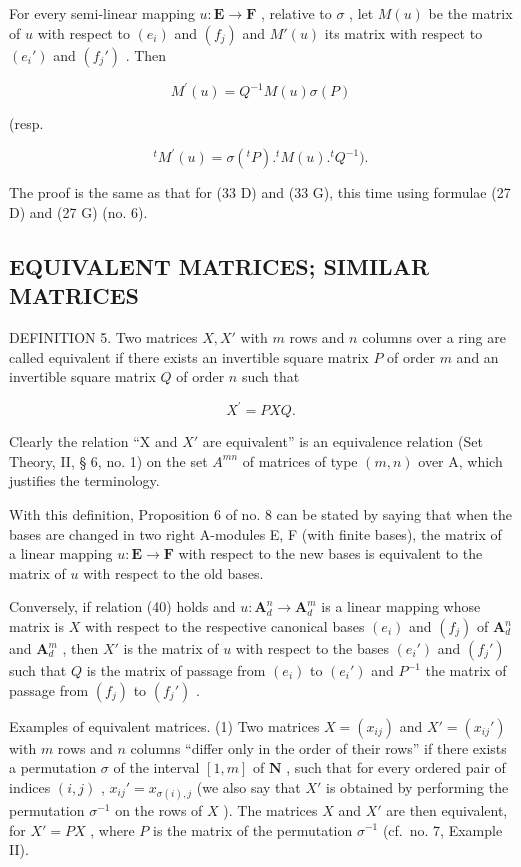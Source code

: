 For every semi-linear mapping \(u: \mathbf{E} \to \mathbf{F}\) , relative to \(\sigma\) , let \(M(u)\) be the matrix of \(u\) with respect to \((e_i)\) and \((f_j)\) and \(M'(u)\) its matrix with respect to \((e_i')\) and \((f_j')\) . Then

\[
M ^ {\prime} (u) = Q ^ {- 1} M (u) \sigma (P)\tag{39 D}
\]

(resp.

\[
{ } ^ { t } M ^ { \prime } ( u ) = \sigma ( { } ^ { t } P ) . { } ^ { t } M ( u ) . { } ^ { t } Q ^ { - 1 } ) .\tag{39 G}
\]

The proof is the same as that for (33 D) and (33 G), this time using formulae (27 D) and (27 G) (no. 6).

\subsection{EQUIVALENT MATRICES; SIMILAR MATRICES}

DEFINITION 5. Two matrices \(X, X'\) with \(m\) rows and \(n\) columns over a ring are called equivalent if there exists an invertible square matrix \(P\) of order \(m\) and an invertible square matrix \(Q\) of order \(n\) such that

\[
X ^ {\prime} = P X Q.\tag{40}
\]

Clearly the relation ``X and \(X'\) are equivalent'' is an equivalence relation (Set Theory, II, § 6, no. 1) on the set \(A^{mn}\) of matrices of type \((m, n)\) over A, which justifies the terminology.

With this definition, Proposition 6 of no. 8 can be stated by saying that when the bases are changed in two right A-modules E, F (with finite bases), the matrix of a linear mapping \(u \colon \mathbf{E} \to \mathbf{F}\) with respect to the new bases is equivalent to the matrix of \(u\) with respect to the old bases.

Conversely, if relation (40) holds and \(u \colon \mathbf{A}_d^n \to \mathbf{A}_d^m\) is a linear mapping whose matrix is \(X\) with respect to the respective canonical bases \((e_i)\) and \((f_j)\) of \(\mathbf{A}_d^n\) and \(\mathbf{A}_d^m\) , then \(X'\) is the matrix of \(u\) with respect to the bases \((e_i')\) and \((f_j')\) such that \(Q\) is the matrix of passage from \((e_i)\) to \((e_i')\) and \(P^{-1}\) the matrix of passage from \((f_j)\) to \((f_j')\) .

Examples of equivalent matrices. (1) Two matrices \(X = (x_{ij})\) and \(X' = (x_{ij}')\) with \(m\) rows and \(n\) columns ``differ only in the order of their rows'' if there exists a permutation \(\sigma\) of the interval \([1, m]\) of \(\mathbf{N}\) , such that for every ordered pair of indices \((i,j)\) , \(x_{ij}' = x_{\sigma(i),j}\) (we also say that \(X'\) is obtained by performing the permutation \(\sigma^{-1}\) on the rows of \(X\) ). The matrices \(X\) and \(X'\) are then equivalent, for \(X' = PX\) , where \(P\) is the matrix of the permutation \(\sigma^{-1}\) (cf.~no. 7, Example II).

